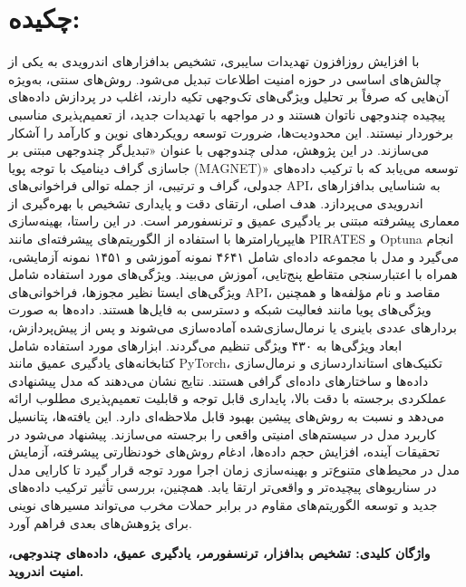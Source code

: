 \chapter*{\vspace{-2.38cm}\fontsize{15}{16}\selectfont چکیده:}
\vspace{-1.5cm}\setlength{\parindent}{20pt}
با افزایش روزافزون تهدیدات سایبری، تشخیص بدافزارهای اندرویدی به یکی از چالش‌های اساسی در حوزه امنیت اطلاعات تبدیل می‌شود. روش‌های سنتی، به‌ویژه آن‌هایی که صرفاً بر تحلیل ویژگی‌های تک‌وجهی تکیه دارند، اغلب در پردازش داده‌های پیچیده چندوجهی ناتوان هستند و در مواجهه با تهدیدات جدید، از تعمیم‌پذیری مناسبی برخوردار نیستند. این محدودیت‌ها، ضرورت توسعه رویکردهای نوین و کارآمد را آشکار می‌سازند. در این پژوهش، مدلی چندوجهی با عنوان «تبدیل‌گر چندوجهی مبتنی بر جاسازی گراف دینامیک با توجه پویا (MAGNET)» توسعه می‌یابد که با ترکیب داده‌های جدولی، گراف و ترتیبی، از جمله توالی فراخوانی‌های API، به شناسایی بدافزارهای اندرویدی می‌پردازد. هدف اصلی، ارتقای دقت و پایداری تشخیص با بهره‌گیری از معماری پیشرفته مبتنی بر یادگیری عمیق و ترنسفورمر است. در این راستا، بهینه‌سازی هایپرپارامترها با استفاده از الگوریتم‌های پیشرفته‌ای مانند PIRATES و Optuna انجام می‌گیرد و مدل با مجموعه داده‌ای شامل ۴۶۴۱ نمونه آموزشی و ۱۴۵۱ نمونه آزمایشی، همراه با اعتبارسنجی متقاطع پنج‌تایی، آموزش می‌بیند. ویژگی‌های مورد استفاده شامل ویژگی‌های ایستا نظیر مجوزها، فراخوانی‌های API، مقاصد و نام مؤلفه‌ها و همچنین ویژگی‌های پویا مانند فعالیت شبکه و دسترسی به فایل‌ها هستند. داده‌ها به صورت بردارهای عددی باینری یا نرمال‌سازی‌شده آماده‌سازی می‌شوند و پس از پیش‌پردازش، ابعاد ویژگی‌ها به ۴۳۰ ویژگی تنظیم می‌گردند. ابزارهای مورد استفاده شامل کتابخانه‌های یادگیری عمیق مانند PyTorch، تکنیک‌های استانداردسازی و نرمال‌سازی داده‌ها و ساختارهای داده‌ای گرافی هستند. نتایج نشان می‌دهند که مدل پیشنهادی عملکردی برجسته با دقت بالا، پایداری قابل توجه و قابلیت تعمیم‌پذیری مطلوب ارائه می‌دهد و نسبت به روش‌های پیشین بهبود قابل ملاحظه‌ای دارد. این یافته‌ها، پتانسیل کاربرد مدل در سیستم‌های امنیتی واقعی را برجسته می‌سازند. پیشنهاد می‌شود در تحقیقات آینده، افزایش حجم داده‌ها، ادغام روش‌های خودنظارتی پیشرفته، آزمایش مدل در محیط‌های متنوع‌تر و بهینه‌سازی زمان اجرا مورد توجه قرار گیرد تا کارایی مدل در سناریوهای پیچیده‌تر و واقعی‌تر ارتقا یابد. همچنین، بررسی تأثیر ترکیب داده‌های جدید و توسعه الگوریتم‌های مقاوم در برابر حملات مخرب می‌تواند مسیرهای نوینی برای پژوهش‌های بعدی فراهم آورد.

\par\vspace{.5cm}\setlength{\parindent}{0pt}
{\bf
واژگان کلیدی: تشخیص بدافزار، ترنسفورمر، یادگیری عمیق، داده‌های چندوجهی، امنیت اندروید.
}
